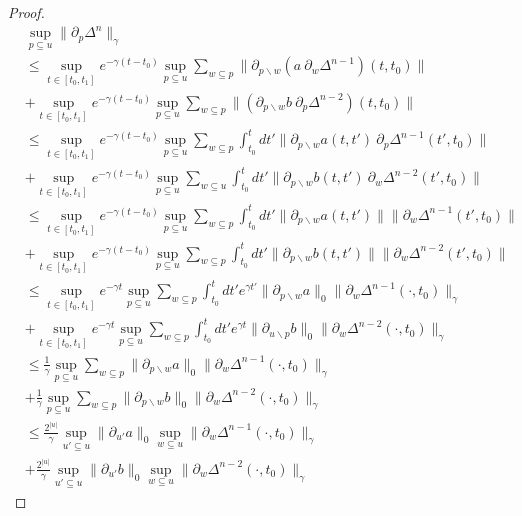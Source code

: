 \documentclass[b5paper,draft,openbib,12pt]{memoir}
\begin{document}
\begin{proof}
\begin{align}
  &\sup_{p\subseteq u}\|\partial_p \Delta^n \|_{\gamma}\\
  &\le 
  \sup_{t\in[t_0,t_1]} e^{-\gamma(t-t_0)}\sup_{p\subseteq u} 
  \sum_{w\subseteq p} 
  \| \partial_{p\backslash w}(a ~
  \partial_w \Delta^{n-1})(t,t_0)\|\\
  &+\sup_{t\in[t_0,t_1]} e^{-\gamma(t-t_0)}\sup_{p\subseteq u} 
  \sum_{w\subseteq p} 
  \|  (\partial_{p\backslash w}b ~
  \partial_p \Delta^{n-2})(t,t_0) \|\\
  &\le
  \sup_{t\in[t_0,t_1]} e^{-\gamma(t-t_0)}
  \sup_{p\subseteq u} \sum_{w\subseteq p} 
  \int_{t_0}^{t}dt' 
  \| \partial_{p\backslash w}a(t,t') ~
  \partial_p \Delta^{n-1}(t',t_0)\|\\
  &+ \sup_{t\in[t_0,t_1]} e^{-\gamma(t-t_0)}
  \sup_{p\subseteq u}\sum_{w\subseteq u} 
  \int_{t_0}^{t}dt'  
  \|  \partial_{p\backslash w}b(t,t') ~
  \partial_w \Delta^{n-2}(t',t_0) \|\\
  &\le
  \sup_{t\in[t_0,t_1]} e^{-\gamma(t-t_0)}
  \sup_{p\subseteq u} \sum_{w\subseteq p} 
  \int_{t_0}^{t}dt' 
  \| \partial_{p\backslash w}a(t,t')\|
  \|\partial_w \Delta^{n-1}(t',t_0)\|\\
  &+ \sup_{t\in[t_0,t_1]} e^{-\gamma(t-t_0)}
  \sup_{p\subseteq u} \sum_{w\subseteq p} 
  \int_{t_0}^{t}dt'  
  \|  \partial_{p\backslash w}b(t,t')\|
  \|\partial_w \Delta^{n-2}(t',t_0) \|\\
  &\le
  \sup_{t\in[t_0,t_1]} e^{-\gamma t}
  \sup_{p\subseteq u} \sum_{w\subseteq p} 
  \int_{t_0}^{t}dt' e^{\gamma t'}
  \| \partial_{p\backslash w}a \|_{0}
  \|\partial_w \Delta^{n-1}(\cdot,t_0)\|_{\gamma}\\
  &+ \sup_{t\in[t_0,t_1]} e^{-\gamma t}
  \sup_{p\subseteq u}\sum_{w\subseteq p} 
  \int_{t_0}^{t}dt'  e^{\gamma t}
  \|  \partial_{u\backslash p}b\|_{0}
\|\partial_w \Delta^{n-2}(\cdot,t_0) \|_{\gamma}\\
&\le
\frac{1}{\gamma}\sup_{p\subseteq u} \sum_{w\subseteq p} 
\| \partial_{p\backslash w}a \|_{0}
\|\partial_w \Delta^{n-1}(\cdot,t_0)\|_{\gamma}\\
&+ \frac{1}{\gamma}
\sup_{p\subseteq u} \sum_{w\subseteq p} 
\|  \partial_{p\backslash w}b\|_{0}
\|\partial_w \Delta^{n-2}(\cdot,t_0) \|_{\gamma}\\
&\le
\frac{2^{|u|}}{\gamma}
\sup_{u'\subseteq u}\| \partial_{u'}a \|_{0}
  \sup_{w\subseteq u} 
\|\partial_w \Delta^{n-1}(\cdot,t_0)\|_{\gamma}\\
&+ \frac{2^{|u|}}{\gamma}
\sup_{u'\subseteq u}\| \partial_{u'}b \|_{0}
\sup_{w\subseteq u}
\|\partial_w \Delta^{n-2}(\cdot,t_0) \|_{\gamma}
\end{align}


\end{proof}
\end{document}

